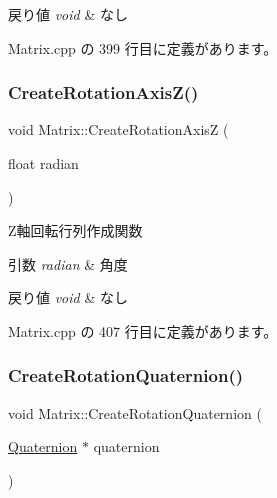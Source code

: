 \begin{DoxyRetVals}{戻り値}
{\em void} & なし \\
\hline
\end{DoxyRetVals}


 Matrix.\+cpp の 399 行目に定義があります。

\mbox{\label{class_matrix_a5b4832fd2246c43250b138980e446f72}} 
\subsubsection{\texorpdfstring{Create\+Rotation\+Axis\+Z()}{CreateRotationAxisZ()}}
{\footnotesize\ttfamily void Matrix\+::\+Create\+Rotation\+AxisZ (\begin{DoxyParamCaption}\item[{float}]{radian }\end{DoxyParamCaption})}



Z軸回転行列作成関数 


\begin{DoxyParams}{引数}
{\em radian} & 角度 \\
\hline
\end{DoxyParams}

\begin{DoxyRetVals}{戻り値}
{\em void} & なし \\
\hline
\end{DoxyRetVals}


 Matrix.\+cpp の 407 行目に定義があります。

\mbox{\label{class_matrix_a5f5948efdd6c0f7c03ba8546f1e9cc4b}} 
\subsubsection{\texorpdfstring{Create\+Rotation\+Quaternion()}{CreateRotationQuaternion()}}
{\footnotesize\ttfamily void Matrix\+::\+Create\+Rotation\+Quaternion (\begin{DoxyParamCaption}\item[{\mbox{\hyperlink{_vector3_d_8h_a3ee38c9c46d9851e33a9a1113328dafc}{Quaternion}} $\ast$}]{quaternion }\end{DoxyParamCaption})}




